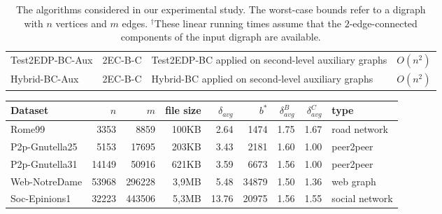\documentclass[11pt]{article}
\begin{document}
\begin{table}[!ht]
\begin{adjustbox}{width=\textwidth,totalheight=\textheight,keepaspectratio}
\begin{small}
\begin{tabu}[t]{p{2.78cm}p{1.32cm}p{8.2cm}p{1.50cm}}
   \textsf{Test2EDP-BC-Aux}             & \textsf{2EC-B-C} & \textsf{Test2EDP-BC} applied on second-level auxiliary graphs & $O(n^2)$ \\
   \textsf{Hybrid-BC-Aux}                   & \textsf{2EC-B-C} & \textsf{Hybrid-BC} applied on second-level auxiliary graphs & $O(n^2)$ \\
  \hline
  \end{tabu}
\end{small}
\end{adjustbox}
\caption{The algorithms considered in our experimental study. The
worst-case bounds refer to a digraph with $n$ vertices and $m$
edges. $^{\dag}$These linear running times assume that the $2$-edge-connected components of the input digraph are available.}
\label{tab:algorithms}
\end{table}
\begin{table}[!ht]
\setlength{\tabcolsep}{4.5pt}
\begin{adjustbox}{width=\textwidth,totalheight=\textheight,keepaspectratio}
\begin{small}
\begin{tabular}{l|rrrrrrr|l}
\hline
Dataset & $n$ & $m$ & file size & $\delta_{avg}$  & $b^{\ast}$ & $\delta_{avg}^{\mathit{B}}$ & $\delta_{avg}^{\mathit{C}}$ &  type  \\
\hline
Rome99           & 3353       & 8859       & 100KB              & 2.64                    & 1474                    & 1.75                              & 1.67                                                  & road network                      \\
P2p-Gnutella25   & 5153       & 17695      & 203KB              & 3.43                    & 2181                    & 1.60                              & 1.00                                                  & peer2peer                         \\
P2p-Gnutella31   & 14149      & 50916      & 621KB              & 3.59                    & 6673                    & 1.56                              & 1.00                                                  & peer2peer                         \\
Web-NotreDame    & 53968      & 296228     & 3,9MB              & 5.48                    & 34879                   & 1.50                              & 1.36                                                  & web graph                         \\
Soc-Epinions1    & 32223      & 443506     & 5,3MB              & 13.76                   & 20975                   & 1.56                              & 1.55                                                  & social network                    \\

\end{tabular}
\end{small}
\end{adjustbox}
\end{table}
\end{document}
